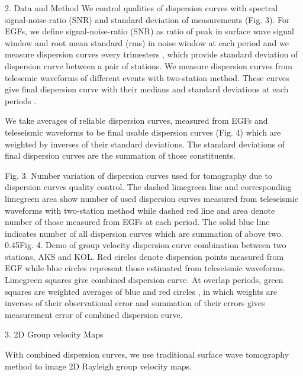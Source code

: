 \documentclass[
    landscape,      %
    paperwidth = 1200mm,
    paperheight = 900mm,
    fontscale = 0.4,
    margin = 1.7cm,
]{baposter}
\begin{document}
\begin{poster}
\begin{posterbox}[column=0, below=auto]{2. Data and Method}
We control qualities of dispersion curves with spectral signal-noise-ratio (SNR) and standard deviation of measurements (Fig. 3).
For EGFs, we define signal-noise-ratio (SNR) as ratio of peak in surface wave signal window and root mean standard (rms) in noise window at each period and we measure dispersion curves every trimesters
, which provide standard deviation of dispersion curve between a pair of stations.
We measure dispersion curves from telesemic waveforms of different events with two-station method.
These curves give final dispersion curve with their medians and standard deviations at each periods .

We take averages of reliable dispersion curves, measured from EGFs and teleseismic waveforms to be final
usable dispersion curves (Fig. 4) which are weighted by inverses of their standard deviations. The standard
deviations of final dispersion curves are the summation of those constituents.

\hspace{0.15cm}

{Fig. 3.}
{Number variation of dispersion curves used for tomography due to dispersion curves quality control. The dashed limegreen line and corresponding limegreen area show
number of used dispersion curves measured from teleseismic waveforms with two-station method while dashed red line and area denote number of those measured from EGFs at each period. The
solid blue line indicates number of all dispersion curves which are summation of above two.}
{0.45\textwidth}{Fig. 4.}
{Demo of group velocity dispersion curve combination between two stations, AKS and KOL.
Red circles denote dispersion points measured from EGF while blue circles represent those estimated from teleseismic waveforms.
Limegreen squares give combined dispersion curve. At overlap periods, green squares are weighted averages of blue and red circles
, in which weights are inverses of their observational error and summation of their errors gives measurement error of combined dispersion curve.
}



\end{posterbox}

\begin{posterbox}[column=1]{3. 2D Group velocity Maps}

With combined dispersion curves, we use traditional surface wave tomography method
to image 2D Rayleigh group velocity maps.


\end{posterbox}
\end{poster}
\end{document}
